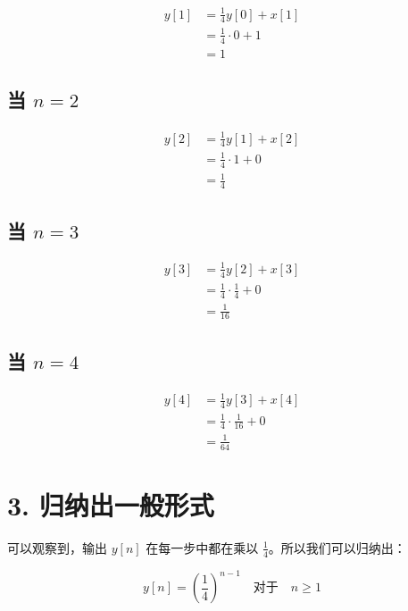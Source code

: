 \documentclass[UTF8]{report}
\theoremstyle{MyLineTheoremStyle} %
\theoremstyle{MyBlockTheoremStyle} %
\theoremstyle{MySubsubsectionStyle} %
\begin{document}
\begin{align*}
    y[1] &= \frac{1}{4} y[0] + x[1] \\
          &= \frac{1}{4} \cdot 0 + 1 \\
          &= 1
\end{align*}

\subsection*{当 $n = 2$}

\begin{align*}
    y[2] &= \frac{1}{4} y[1] + x[2] \\
          &= \frac{1}{4} \cdot 1 + 0 \\
          &= \frac{1}{4}
\end{align*}

\subsection*{当 $n = 3$}

\begin{align*}
    y[3] &= \frac{1}{4} y[2] + x[3] \\
          &= \frac{1}{4} \cdot \frac{1}{4} + 0 \\
          &= \frac{1}{16}
\end{align*}

\subsection*{当 $n = 4$}

\begin{align*}
    y[4] &= \frac{1}{4} y[3] + x[4] \\
          &= \frac{1}{4} \cdot \frac{1}{16} + 0 \\
          &= \frac{1}{64}
\end{align*}

\section*{3. 归纳出一般形式}

可以观察到，输出 $y[n]$ 在每一步中都在乘以 $\frac{1}{4}$。所以我们可以归纳出：

\begin{equation}
    y[n] = \left(\frac{1}{4}\right)^{n-1} \quad \text{对于} \quad n \geq 1
\end{equation}
\end{document}
